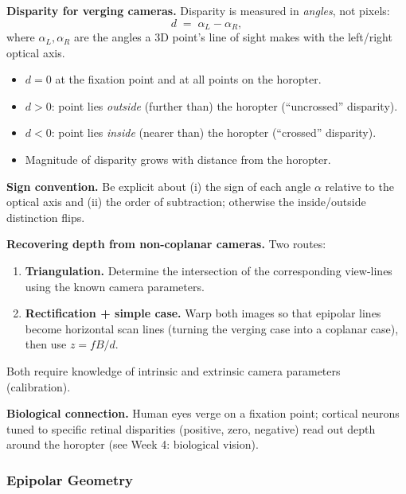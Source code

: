 \textbf{Disparity for verging cameras.} Disparity is measured in \emph{angles}, not pixels:
\[
d \;=\; \alpha_L - \alpha_R,
\]
where $\alpha_L, \alpha_R$ are the angles a 3D point's line of sight makes with the left/right optical axis.
\begin{itemize}
  \item $d = 0$ at the fixation point and at all points on the horopter.
  \item $d > 0$: point lies \emph{outside} (further than) the horopter (``uncrossed'' disparity).
  \item $d < 0$: point lies \emph{inside} (nearer than) the horopter (``crossed'' disparity).
  \item Magnitude of disparity grows with distance from the horopter.
\end{itemize}

\textbf{Sign convention.} Be explicit about (i) the sign of each angle $\alpha$ relative to the optical axis and (ii) the order of subtraction; otherwise the inside/outside distinction flips.

\separator

\textbf{Recovering depth from non-coplanar cameras.} Two routes:
\begin{enumerate}
  \item \textbf{Triangulation.} Determine the intersection of the corresponding view-lines using the known camera parameters.
  \item \textbf{Rectification + simple case.} Warp both images so that epipolar lines become horizontal scan lines (turning the verging case into a coplanar case), then use $z = fB/d$.
\end{enumerate}
Both require knowledge of intrinsic and extrinsic camera parameters (calibration).

\textbf{Biological connection.} Human eyes verge on a fixation point; cortical neurons tuned to specific retinal disparities (positive, zero, negative) read out depth around the horopter (see Week 4: biological vision).

\bigseparator

\subsubsection{Epipolar Geometry}

